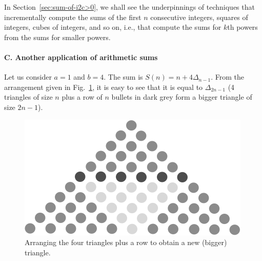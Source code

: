 %

\medskip

In Section~\ref{sec:sum-of-i2c>0}, we shall see the underpinnings of 
techniques that incrementally compute the sums of the first $n$
consecutive integers, squares of integers, cubes of integers, and so
on, i.e., that compute the sums for $k$th powers from the sums for
smaller powers.

\paragraph{\small\sf C. Another application of arithmetic sums}

Let us consider $a=1$ and $b=4$. 
The sum is $S(n)=n+4 \Delta_{n-1}$.
From the arrangement given in Fig.~\ref{fig:Delta(n)4}, it is easy to see that it is equal to $\Delta_{2n-1}$ (4 triangles of size $n$ plus a row of $n$ bullets in dark grey
form a bigger triangle of size $2n-1$).
\begin{figure}[h]
\begin{center}
       \includegraphics[scale=0.5]{FiguresMaths/Delta(n)4}
 \caption{Arranging the four triangles plus a row to obtain a new (bigger) triangle.}
       \label{fig:Delta(n)4}
\end{center}
\end{figure}

